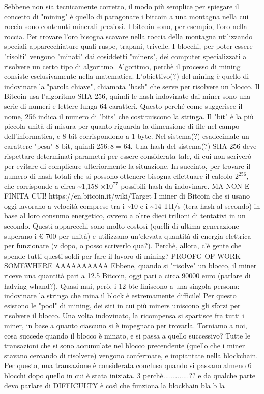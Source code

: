 \documentclass {article}
\begin{document}
Sebbene non sia tecnicamente corretto, il modo più semplice per spiegare il concetto di "mining" è quello di paragonare i bitcoin a una montagna nella cui roccia sono contenuti minerali preziosi.
I bitcoin sono, per esempio, l'oro nella roccia.
Per trovare l'oro bisogna scavare nella roccia della montagna utilizzando speciali apparecchiature quali ruspe, trapani, trivelle.
I blocchi, per poter essere "risolti" vengono "minati" dai cosiddetti "miners", dei computer specializzati a risolvere un certo tipo di algoritmo.
Algoritmo, perchè il processo di mining consiste esclusivamente nella matematica.
L'obiettivo(?) del mining è quello di indovinare la "parola chiave", chiamata "hash" che serve per risolvere un blocco.
Il Bitcoin usa l'algoritmo SHA-256, quindi le hash indovinate dai miner sono una serie di numeri e lettere lunga 64 caratteri.
Questo perché come suggerisce il nome, 256 indica il numero di "bits" che costituiscono la stringa.
Il "bit" è la più piccola unità di misura per quanto riguarda la dimensione di file nel campo dell'informatica, e 8 bit corrispondono a 1 byte.
Nel sistema(?) esadecimale un carattere "pesa" 8 bit, quindi $256 : 8 = 64$.
Una hash del sistema(?) SHA-256 deve rispettare determinati parametri per essere considerata tale, di cui non scriverò per evitare di complicare ulteriormente la situazione.
In succinto, per trovare il numero di hash totali che si possono ottenere bisogna effettuare il  calcolo $2^{256}$, che corrisponde a circa \textasciitilde 1,158 $\times 10^{77}$ possibili hash da indovinare.
MA NON E FINITA CUI! https://en.bitcoin.it/wiki/Target
I miner di Bitcoin che si usano oggi lavorano a velocità comprese tra i \textasciitilde 10 e i \textasciitilde 14 TH/s (tera-hash al secondo) in base al loro consumo energetico, ovvero a oltre dieci trilioni di tentativi in un secondo.
Questi apparecchi sono molto costosi (quelli di ultima generazione superano i \euro{} 700 per unità) e utilizzano un'elevata quantità di energia elettrica per funzionare (v dopo, o posso scriverlo qua?).
Perchè, allora, c'è gente che spende tutti questi soldi per fare il lavoro di mining? PROOFG  OF WORK SOMEWHERE AAAAAAAAAA
Ebbene, quando si "risolve" un blocco, il miner riceve una quantità pari a 12.5 Bitcoin, oggi pari a circa 90000 euro (parlare di halving whand?).
Quasi mai, però, i 12 btc finiscono a una singola persona: indovinare la stringa che mina il block è estremamente difficile!
Per questo esistono le "pool" di mining, dei siti in cui più miners uniscono gli sforzi per risolvere il blocco.
Una volta indovinato, la ricompensa si spartisce fra tutti i miner, in base a quanto ciascuno si è impegnato per trovarla.
Torniamo a noi, cosa succede quando il blocco è minato, e si passa a quello successivo?
Tutte le transazioni che si sono accumulate nel blocco precendente (quello che i miner stavano cercando di risolvere) vengono confermate, e impiantate nella blockchain.
Per questo, una transazione è considerata conclusa quando si passano almeno 6 blocchi dopo quello in cui è stata iniziata.
3 perchè.............?? e da qualche parte devo parlare di DIFFICULTY
è così che funziona la blockhain bla b la
\end{document}
